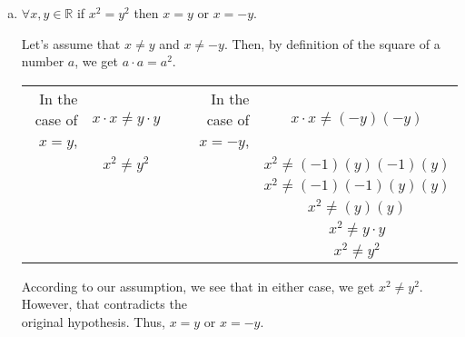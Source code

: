 \documentclass{article}
\begin{document}
\begin{flushleft}
\begin{enumerate}[a)]
\item $\forall x,y \in \mathbb{R}$ if $x^2=y^2$ then $x=y$ or $x=-y$.\\
\begin{flushleft}
\qquad Let's assume that $x \neq y$ and $x \neq -y$. Then, by definition of the square of a number $a$, we get $a \cdot a = a^2$. \\

\begin{center}
\begin{tabular}{r c c r c}
In the case of $x=y$, & $x \cdot x \neq y \cdot y$ & & In the case of $x=-y$, & $x \cdot x \neq (-y)(-y)$\\
& $x^2 \neq y^2$ & & & $x^2 \neq (-1)(y)(-1)(y)$ \\
& & & & $x^2 \neq (-1)(-1)(y)(y)$ \\
& & & & $x^2 \neq (y)(y)$ \\
& & & & $x^2 \neq y \cdot y$ \\
& &  & & $x^2 \neq y^2$\\
\end{tabular}
\end{center}
\qquad According to our assumption, we see that in either case, we get $x^2 \neq y^2$. However, that contradicts the \\
\qquad original hypothesis. Thus, $x = y$ or $x = -y$.\\

\end{flushleft}
\end{enumerate}
\end{flushleft}

\end{document}

